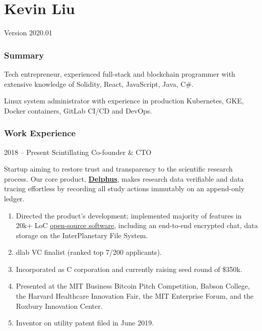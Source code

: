 \documentclass[paper=letter]{tccv}
\begin{document}
\part{Kevin Liu}


Version 2020.01

\section{Summary}

Tech entrepreneur, experienced full-stack and blockchain programmer with extensive knowledge of Solidity, React, JavaScript, Java, C\#.

Linux system administrator with experience in production Kubernetes, GKE, Docker containers, GitLab CI/CD and DevOps.

\section{Work Experience}

\begin{eventlist}

\item{2018 -- Present}
     {Scintillating}
     {Co-founder \& CTO}

Startup aiming to restore trust and transparency to the scientific research process. Our core product, \href{https://delph.us}{\textbf{Delphus}}, makes research data verifiable and data tracing effortless by recording all study actions immutably on an append-only ledger.

\end{eventlist}

\vspace{-0.5cm}
\begin{enumerate}
     \item Directed the product's development; implemented majority of features in 20k+ LoC \href{https://gitlab.scintillating.us/scintillating/delphus}{open-source software}, including an end-to-end encrypted chat, data storage on the InterPlanetary File System.
     \item dlab VC finalist (ranked top 7/200 applicants).
     \item Incorporated as C corporation and currently raising seed round of \$350k.
     \item Presented at the MIT Business Bitcoin Pitch Competition, Babson College, the Harvard Healthcare Innovation Fair, the MIT Enterprise Forum, and the Roxbury Innovation Center.
     \item Inventor on utility patent filed in June 2019.
\end{enumerate}
\end{document}
